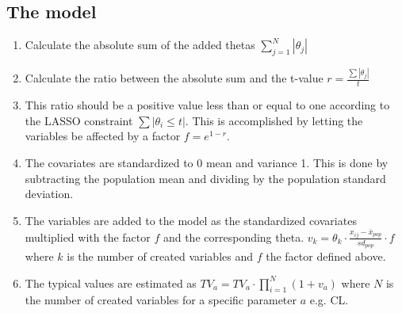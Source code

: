 \subsection{The model}
\begin{enumerate}
    \item Calculate the absolute sum of the added thetas $\sum_{j=1}^N |\theta_j|$ 
    \item Calculate the ratio between the absolute sum and the t-value $r = \frac{\sum{|\theta_j|}}{t}$
    \item This ratio should be a positive value less than or equal to one according to the LASSO constraint $\sum{|\theta_i \le t|}$. This is accomplished by letting the variables be affected by a factor $f=e^{1-r}$.
    \item The covariates are standardized to 0 mean and variance 1. This is done by subtracting the population mean and dividing by the population standard deviation.
    \item The variables are added to the model as the standardized covariates multiplied with the factor $f$ and the corresponding theta. $v_k = \theta_k \cdot \frac{x_{ij} - \bar{x}_{pop}}{sd_{pop}} \cdot f$ where $k$ is the number of created variables and $f$ the factor defined above.
    \item The typical values are estimated as $TV_a = TV_a \cdot \prod_{i=1}^N ( 1+v_a)$ where $N$ is the number of created variables for a specific parameter $a$ e.g. CL.
\end{enumerate}



